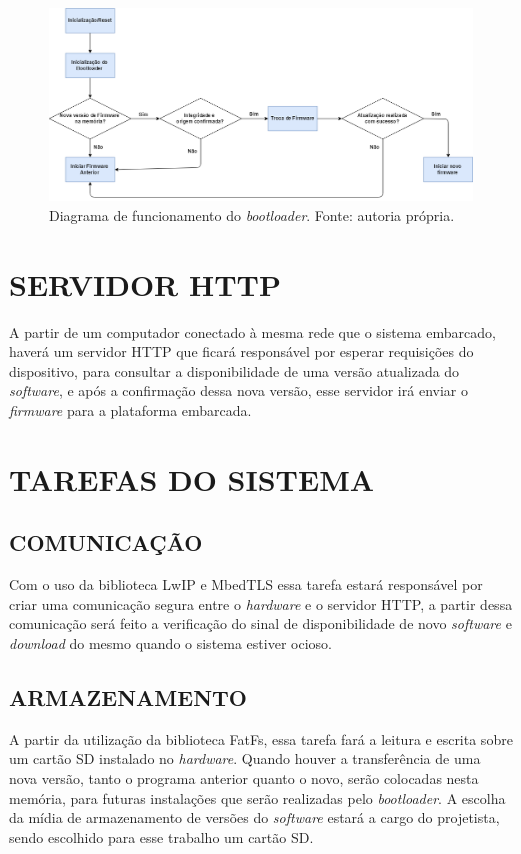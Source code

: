 \begin{figure}[H]
    \scriptsize
     \centering
     \includegraphics[scale=0.39]{dados/figuras/DiagramaBootloader.png}
     \caption{Diagrama de funcionamento do \textit{bootloader}. Fonte: autoria própria.}
     \label{Diagrama Bootloader}
\end{figure}

\section{SERVIDOR HTTP}
\label{sec:ServidorHTTP}

A partir de um computador conectado à mesma rede que o sistema embarcado, haverá um servidor HTTP que ficará responsável por esperar requisições do dispositivo, para consultar a disponibilidade de uma versão atualizada do \textit{software}, e após a confirmação dessa nova versão, esse servidor irá enviar o \textit{firmware} para a plataforma embarcada.

\section{TAREFAS DO SISTEMA}
\label{sec:Tarefassistema}

\subsection{COMUNICAÇÃO}

Com o uso da biblioteca LwIP e MbedTLS essa tarefa estará responsável por criar uma comunicação segura entre o \textit{hardware} e o servidor HTTP, a partir dessa comunicação será feito a verificação do sinal de disponibilidade de novo \textit{software} e \textit{download} do mesmo quando o sistema estiver ocioso. 

\subsection{ARMAZENAMENTO}

A partir da utilização da biblioteca FatFs, essa tarefa fará a leitura e escrita sobre um cartão SD instalado no \textit{hardware}. Quando houver a transferência de uma nova versão, tanto o programa anterior quanto o novo, serão colocadas nesta memória, para futuras instalações que serão realizadas pelo \textit{bootloader}. A escolha da mídia de armazenamento de versões do \textit{software} estará a cargo do projetista, sendo escolhido para esse trabalho um cartão SD.


